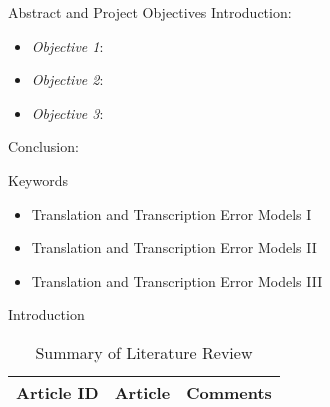 


\setlength{\belowcaptionskip}{2ex}
\setlength\belowdisplayshortskip{2ex}
\begin{frame}[t]
\begin{columns}[t]
\begin{column}{\onecolwid} %
\begin{alertblock}{Abstract and Project Objectives}
Introduction:
\begin{itemize}
\item \textit{Objective 1}: 
\item \textit{Objective 2}: 
\item \textit{Objective 3}: 
\end{itemize}
Conclusion:
\end{alertblock}
\begin{block}{Keywords}
\begin{itemize}
\item Translation and Transcription Error Models I
\item Translation and Transcription Error Models II
\item Translation and Transcription Error Models III
\end{itemize}	
\end{block}
\begin{alertblock}{Introduction}

\begin{table}[H]
	\centering
	\begin{tabular}{r|p{12cm}|l}
	\hline
	Article ID  & Article & Comments \\
	\hline
	\hline
	\end{tabular}
	\caption{Summary of Literature Review}
\end{table} 


\end{alertblock}
\end{column}
\end{columns}
\end{frame}

